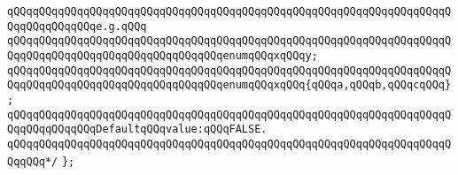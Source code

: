 \verb|qQQqqQQqqQQqqQQqqQQqqQQqqQQqqQQqqQQqqQQqqQQqqQQqqQQqqQQqqQQqqQQqqQQqqQQqqQQqqQQqqQQqe.g.qQQq|\newline
\verb|qQQqqQQqqQQqqQQqqQQqqQQqqQQqqQQqqQQqqQQqqQQqqQQqqQQqqQQqqQQqqQQqqQQqqQQqqQQqqQQqqQQqqQQqqQQqqQQqqQQqqQQqenumqQQqxqQQqy;|\newline
\verb|qQQqqQQqqQQqqQQqqQQqqQQqqQQqqQQqqQQqqQQqqQQqqQQqqQQqqQQqqQQqqQQqqQQqqQQqqQQqqQQqqQQqqQQqqQQqqQQqqQQqqQQqenumqQQqxqQQq{qQQqa,qQQqb,qQQqcqQQq};|\newline
\verb|qQQqqQQqqQQqqQQqqQQqqQQqqQQqqQQqqQQqqQQqqQQqqQQqqQQqqQQqqQQqqQQqqQQqqQQqqQQqqQQqqQQqDefaultqQQqvalue:qQQqFALSE.|\newline
\verb|qQQqqQQqqQQqqQQqqQQqqQQqqQQqqQQqqQQqqQQqqQQqqQQqqQQqqQQqqQQqqQQqqQQqqQQqqQQq*/|\newline
\verb|};|\newline
\newline
\newline
\newline

